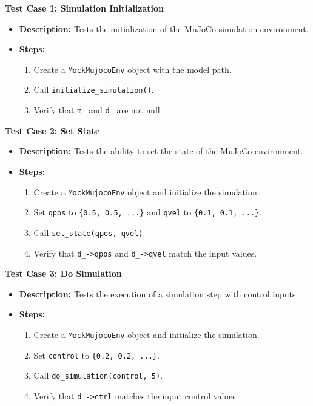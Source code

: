 \documentclass[12pt, titlepage]{article}
\begin{document}
\textbf{Test Case 1: Simulation Initialization}
\begin{itemize}
    \item \textbf{Description:} Tests the initialization of the MuJoCo simulation environment.
    \item \textbf{Steps:}
    \begin{enumerate}
        \item Create a \texttt{MockMujocoEnv} object with the model path.
        \item Call \texttt{initialize\_simulation()}.
        \item Verify that \texttt{m\_} and \texttt{d\_} are not null.
    \end{enumerate}
\end{itemize}

\textbf{Test Case 2: Set State}
\begin{itemize}
    \item \textbf{Description:} Tests the ability to set the state of the MuJoCo environment.
    \item \textbf{Steps:}
    \begin{enumerate}
        \item Create a \texttt{MockMujocoEnv} object and initialize the simulation.
        \item Set \texttt{qpos} to \texttt{\{0.5, 0.5, ...\}} and \texttt{qvel} to \texttt{\{0.1, 0.1, ...\}}.
        \item Call \texttt{set\_state(qpos, qvel)}.
        \item Verify that \texttt{d\_->qpos} and \texttt{d\_->qvel} match the input values.
    \end{enumerate}
\end{itemize}

\textbf{Test Case 3: Do Simulation}
\begin{itemize}
    \item \textbf{Description:} Tests the execution of a simulation step with control inputs.
    \item \textbf{Steps:}
    \begin{enumerate}
        \item Create a \texttt{MockMujocoEnv} object and initialize the simulation.
        \item Set \texttt{control} to \texttt{\{0.2, 0.2, ...\}}.
        \item Call \texttt{do\_simulation(control, 5)}.
        \item Verify that \texttt{d\_->ctrl} matches the input control values.
    \end{enumerate}
\end{itemize}
\end{document}
